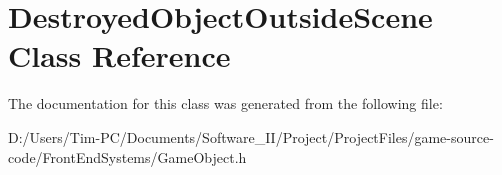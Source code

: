 \hypertarget{class_destroyed_object_outside_scene}{}\section{Destroyed\+Object\+Outside\+Scene Class Reference}
\label{class_destroyed_object_outside_scene}


The documentation for this class was generated from the following file\+:\begin{DoxyCompactItemize}
\item 
D\+:/\+Users/\+Tim-\/\+P\+C/\+Documents/\+Software\+\_\+\+I\+I/\+Project/\+Project\+Files/game-\/source-\/code/\+Front\+End\+Systems/Game\+Object.\+h\end{DoxyCompactItemize}
